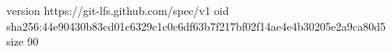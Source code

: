 version https://git-lfs.github.com/spec/v1
oid sha256:44e90430b83cd01c6329c1c0c6df63b7f217bf02f14ae4e4b30205e2a9ca80d5
size 90
